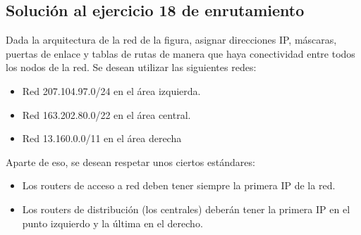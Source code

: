 \documentclass[letterpaper,10pt,spanish]{sphinxmanual}
\begin{document}
\subsection{Solución al ejercicio 18 de enrutamiento}
\label{\detokenize{t2_integracion_elementos/ejercicios_subredes_ipv4/ejercicios_dos_router:solucion-al-ejercicio-18-de-enrutamiento}}
\sphinxAtStartPar
Dada la arquitectura de la red de la figura, asignar direcciones IP, máscaras, puertas de enlace y tablas de rutas de manera que haya conectividad entre todos
los nodos de la red. Se desean utilizar las siguientes redes:
\begin{itemize}
\item {} 
\sphinxAtStartPar
Red 207.104.97.0/24 en el área izquierda.

\item {} 
\sphinxAtStartPar
Red 163.202.80.0/22 en el área central.

\item {} 
\sphinxAtStartPar
Red 13.160.0.0/11 en el área derecha

\end{itemize}

\begin{figure}[htbp]
\centering

\noindent{}
\end{figure}

\sphinxAtStartPar
Aparte de eso, se desean respetar unos ciertos estándares:
\begin{itemize}
\item {} 
\sphinxAtStartPar
Los routers de acceso a red deben tener siempre la primera IP de la red.

\item {} 
\sphinxAtStartPar
Los routers de distribución (los centrales) deberán tener la primera IP en el punto izquierdo y la última en el derecho.

\end{itemize}
\end{document}
